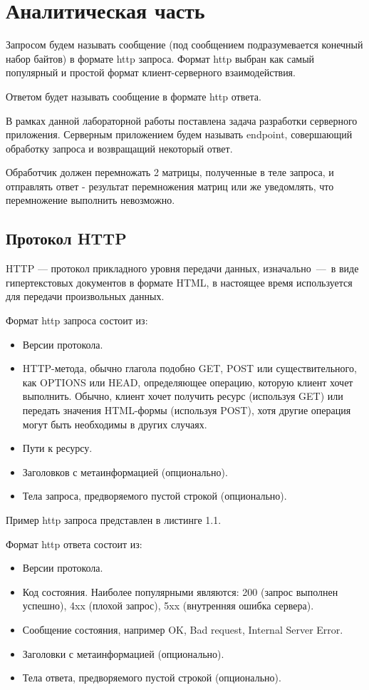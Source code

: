 \chapter{Аналитическая часть}

Запросом будем называть сообщение (под сообщением подразумевается конечный набор байтов) в формате http запроса. Формат http выбран как самый популярный и простой формат клиент-серверного взаимодействия.

Ответом будет называть сообщение в формате http ответа.

В рамках данной лабораторной работы поставлена задача разработки серверного приложения. Серверным приложением будем называть endpoint, совершающий обработку запроса и возвращащий некоторый ответ.

Обработчик должен перемножать 2 матрицы, полученные в теле запроса, и отправлять ответ - результат перемножения матриц или же уведомлять, что перемножение выполнить невозможно.


\section{Протокол HTTP}

HTTP — протокол прикладного уровня передачи данных, изначально~—~в виде гипертекстовых документов в формате HTML, в настоящее время используется для передачи произвольных данных.

Формат http запроса состоит из:
\begin{itemize}
	\item Версии протокола.
	\item HTTP-метода, обычно глагола подобно GET, POST или существительного, как OPTIONS или HEAD, определяющее операцию, которую клиент хочет выполнить. Обычно, клиент хочет получить ресурс (используя GET) или передать значения HTML-формы (используя POST), хотя другие операция могут быть необходимы в других случаях.
	\item Пути к ресурсу.
	\item Заголовков с метаинформацией (опционально).
	\item Тела запроса, предворяемого пустой строкой (опционально).
\end{itemize}

Пример http запроса представлен в листинге 1.1.

\pagebreak
Формат http ответа состоит из:

\begin{itemize}
	\item Версии протокола.
	\item Код состояния. Наиболее популярными являются: 200 (запрос выполнен успешно), 4xx (плохой запрос), 5xx (внутренняя ошибка сервера).
	\item Сообщение состояния, например OK, Bad request, Internal Server Error.
	\item Заголовки с метаинформацией (опционально).		
	\item Тела ответа, предворяемого пустой строкой (опционально).
\end{itemize}

